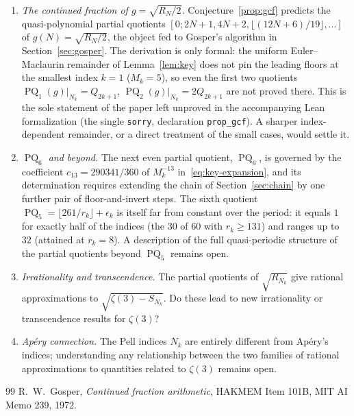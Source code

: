 \documentclass[10pt,a4paper]{amsart}
\newcommand{\floor}[1]{\lfloor #1 \rfloor}
\DeclareMathOperator{\PQ}{PQ}
\begin{document}
\begin{enumerate}
  \item \textit{The continued fraction of $g = \sqrt{R_N/2}$.}\label{op:gcf}
    Conjecture~\ref{prop:gcf} predicts the quasi-polynomial partial quotients
    $[0; 2N+1, 4N+2, \floor{(12N+6)/19}, \ldots]$ of $g(N) = \sqrt{R_N/2}$,
    the object fed to Gosper's algorithm in Section~\ref{sec:gosper}.  The
    derivation is only formal: the uniform Euler--Maclaurin remainder of
    Lemma~\ref{lem:key} does not pin the leading floors at the smallest index
    $k = 1$ ($M_k = 5$), so even the first two quotients
    $\PQ_1(g)|_{N_k} = Q_{2k+1}$, $\PQ_2(g)|_{N_k} = 2Q_{2k+1}$ are not proved
    there.  This is the sole statement of the paper left unproved in the
    accompanying Lean formalization (the single \texttt{sorry}, declaration
    \texttt{prop\_gcf}).  A sharper index-dependent remainder, or a direct
    treatment of the small cases, would settle it.

  \item \textit{$\PQ_6$ and beyond.}
    The next even partial quotient, $\PQ_6$, is governed by the coefficient
    $c_{13} = 290341/360$ of $M_k^{-13}$ in~\eqref{eq:key-expansion}, and its
    determination requires extending the chain of Section~\ref{sec:chain} by
    one further pair of floor-and-invert steps.  The sixth quotient
    $\PQ_5 = \floor{261/r_k} + \epsilon_k$ is itself far from constant over
    the period: it equals $1$ for exactly half of the indices (the $30$ of
    $60$ with $r_k \ge 131$) and ranges up to $32$ (attained at $r_k = 8$).
    A description of the full quasi-periodic structure of the partial
    quotients beyond $\PQ_5$ remains open.

  \item \textit{Irrationality and transcendence.}
    The partial quotients of $\sqrt{R_{N_k}}$ give rational approximations
    to $\sqrt{\zeta(3) - S_{N_k}}$.  Do these lead to new irrationality
    or transcendence results for $\zeta(3)$?

  \item \textit{Ap\'ery connection.}
    The Pell indices $N_k$ are entirely different from Ap\'ery's indices;
    understanding any relationship between the two families of rational
    approximations to quantities related to $\zeta(3)$ remains open.
\end{enumerate}

\begin{thebibliography}{99}
 R.~W.~Gosper, \emph{Continued fraction arithmetic}, HAKMEM Item 101B, MIT AI Memo 239, 1972.
\end{thebibliography}
\end{document}
